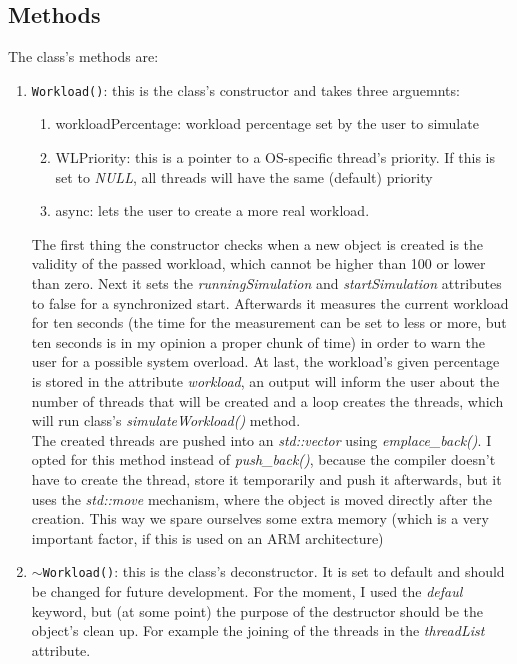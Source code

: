 \subsection{Methods}
The class's methods are:
\begin{enumerate}
	\item \texttt{Workload()}: this is the class's constructor and takes three arguemnts:
	\begin{enumerate}
		\item workloadPercentage: workload percentage set by the user to simulate
		\item WLPriority: this is a pointer to a OS-specific thread's priority. If this is set to \textit{NULL}, all threads will have the same (default) priority
		\item async: lets the user to create a more \dq real\dq{} workload.   
	\end{enumerate}
	The first thing the constructor checks when a new object is created is the validity of the passed workload, which cannot be higher than 100 or lower than zero. Next it sets the \textit{runningSimulation} and \textit{startSimulation} attributes to false for a synchronized start. Afterwards it measures the current workload for ten seconds (the time for the measurement can be set to less or more, but ten seconds is in my opinion a proper chunk of time) in order to warn the user for a possible system overload.
	At last, the workload's given percentage is stored in the attribute \textit{workload}, an output will inform the user about the number of threads that will be created and a loop creates the threads, which will run class's \textit{simulateWorkload()} method.\\
	The created threads are pushed into an \textit{std::vector} using \textit{emplace\_back()}. I opted for this method instead of \textit{push\_back()}, because the compiler doesn't have to create the thread, store it temporarily and push it afterwards, but it uses the \textit{std::move} mechanism, where the object is moved directly after the creation. This way we spare ourselves some extra memory (which is a very important factor, if this is used on an ARM architecture)
	\item \texttt{$\sim$Workload()}: this is the class's deconstructor. It is set to default and should be changed for future development. For the moment, I used the \textit{defaul} keyword, but (at some point) the purpose of the destructor should be the object's clean up. For example the joining of the threads in the \textit{threadList} attribute. 

\end{enumerate}
